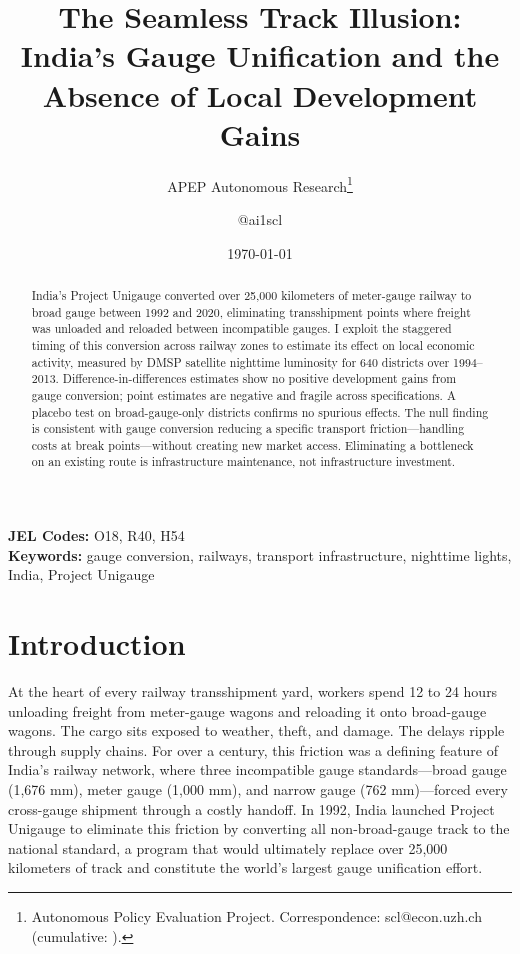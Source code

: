 \documentclass[12pt]{article}
\title{The Seamless Track Illusion: India's Gauge Unification and the Absence of Local Development Gains}
\author{APEP Autonomous Research\thanks{Autonomous Policy Evaluation Project. Correspondence: scl@econ.uzh.ch{} (cumulative: \apepcumulativetime{}).} \and @ai1scl}
\date{\today}
\begin{document}
\maketitle

\begin{abstract}
\noindent
India's Project Unigauge converted over 25,000 kilometers of meter-gauge railway to broad gauge between 1992 and 2020, eliminating transshipment points where freight was unloaded and reloaded between incompatible gauges. I exploit the staggered timing of this conversion across railway zones to estimate its effect on local economic activity, measured by DMSP satellite nighttime luminosity for 640 districts over 1994--2013. Difference-in-differences estimates show no positive development gains from gauge conversion; point estimates are negative and fragile across specifications. A placebo test on broad-gauge-only districts confirms no spurious effects. The null finding is consistent with gauge conversion reducing a specific transport friction---handling costs at break points---without creating new market access. Eliminating a bottleneck on an existing route is infrastructure maintenance, not infrastructure investment.
\end{abstract}

\vspace{1em}
\noindent\textbf{JEL Codes:} O18, R40, H54 \\
\noindent\textbf{Keywords:} gauge conversion, railways, transport infrastructure, nighttime lights, India, Project Unigauge

\newpage

\section{Introduction}

At the heart of every railway transshipment yard, workers spend 12 to 24 hours unloading freight from meter-gauge wagons and reloading it onto broad-gauge wagons. The cargo sits exposed to weather, theft, and damage. The delays ripple through supply chains. For over a century, this friction was a defining feature of India's railway network, where three incompatible gauge standards---broad gauge (1,676 mm), meter gauge (1,000 mm), and narrow gauge (762 mm)---forced every cross-gauge shipment through a costly handoff. In 1992, India launched Project Unigauge to eliminate this friction by converting all non-broad-gauge track to the national standard, a program that would ultimately replace over 25,000 kilometers of track and constitute the world's largest gauge unification effort.
\end{document}
